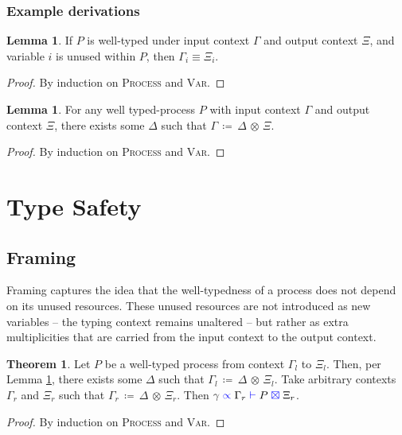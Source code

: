 \documentclass[a4paper,UKenglish,cleveref, autoref, thm-restate,authorcolumns]{lipics-v2019}
\theoremstyle{definition}
\newtheorem{nitheorem}[theorem]{Theorem}
\newtheorem{nilemma}[theorem]{Lemma}
\newcommand{\type}[1]{\textcolor{blue}{\operatorname{#1}}}
\newcommand{\opctx}[3]{#1 \, \coloneqq \, #2 \, \otimes \, #3}
\newcommand{\types}[4]{#1 \; \type{\propto} \; #2 \; \type{\vdash} \; #3 \; \type{\boxtimes} \; #4}
\begin{document}
\subsubsection{Example derivations}
\label{example-derivations}



\begin{nilemma}
  \label{lm:types-unused}
  If $P$ is well-typed under input context $\Gamma$ and output context $\Xi$, and variable $i$ is unused within $P$, then $\Gamma_i \equiv \Xi_i$.
\end{nilemma}
\begin{proof}
  By induction on \textsc{Process} and \textsc{Var}.
\end{proof}

\begin{nilemma}
  \label{lm:types-op}
  For any well typed-process $P$ with input context $\Gamma$ and output context $\Xi$, there exists some $\Delta$ such that $\opctx{\Gamma}{\Delta}{\Xi}$.
\end{nilemma}
\begin{proof}
  By induction on \textsc{Process} and \textsc{Var}.
\end{proof}


\section{Type Safety}
\label{type-safety}


\subsection{Framing}
\label{framing}

Framing captures the idea that the well-typedness of a process does not depend on its unused resources.
These unused resources are not introduced as new variables -- the typing context remains unaltered -- but rather as extra multiplicities that are carried from the input context to the output context.

\begin{nitheorem}
  \label{thm:framing}
  Let $P$ be a well-typed process from context $\Gamma_l$ to $\Xi_l$.
  Then, per Lemma \ref{lm:types-op}, there exists some $\Delta$ such that $\opctx{\Gamma_l}{\Delta}{\Xi_l}$.
  Take arbitrary contexts $\Gamma_r$ and $\Xi_r$ such that $\opctx{\Gamma_r}{\Delta}{\Xi_r}$.
  Then $\types{\gamma}{\Gamma_r}{P}{\Xi_r}$.
\end{nitheorem}
\begin{proof}
  By induction on \textsc{Process} and \textsc{Var}.
\end{proof}
\end{document}
